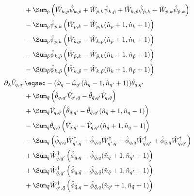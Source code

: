 \begin{appendix}
\begin{subequations}
\begin{align}
&+\Sum_{\tilde p} \left(\hat W_{k,\tilde p}\hat \psi_{k,\tilde p}+\hat W_{\tilde p,k}\hat \psi_{k,\tilde p}+\hat W_{k,\tilde p}\hat \psi_{\tilde p,k}  + \hat W_{\tilde p,k}\hat \psi_{\tilde p,k}\right) \nonumber\\
&- \Sum_{\tilde p}\hat \psi_{\tilde p,k} \left(\hat W_{ \tilde p,k}-\hat W_{ \tilde p,k}(\hat n_{\tilde p}+1,\hat n_{k}+1)\right)\nonumber\\
&-\Sum_{\tilde p}\hat \psi_{\tilde p,k} \left(\hat W_{k,\tilde p}-\hat W_{k,\tilde p}(\hat n_{\tilde p}+1,\hat n_{k}+1)\right) \nonumber\\
&-\Sum_{\tilde p}\hat \psi_{k,\tilde p} \left(\hat W_{\tilde p,k}-\hat W_{\tilde p,k}(\hat n_{k}+1,\hat n_{\tilde p}+1)\right) \nonumber\\
&-\Sum_{\tilde p}\hat \psi_{k,\tilde p} \left(\hat W_{k, \tilde p}-\hat W_{k, \tilde p}(\hat n_{k}+1,\hat n_{\tilde p}+1)\right) \nonumber\\
\partial_\lambda\hat V_{q,q^\prime}&\eqsec -(\hat\omega_q-\hat\omega_{q^\prime}(\hat n_q-1,\hat n_{q^\prime}+1))\hat \theta_{q,q^\prime}\\
&+ \Sum_{\tilde q} \left(\hat\theta_{q,q^\prime}\hat V_{q^\prime,\tilde q}-\hat\theta_{\tilde q,q^\prime}\hat V_{q,\tilde q}\right) \nonumber\\
&+\Sum_{\tilde q} \hat V_{q,\tilde q}\left(\hat\theta_{\tilde q,q^\prime}-\hat\theta_{\tilde q,q^\prime}(\hat n_{\tilde q}+1,\hat n_q-1)\right)\nonumber \\
&-\Sum_{\tilde q} \hat \theta_{q,\tilde q}\left(\hat V_{\tilde q,q^\prime}-\hat V_{\tilde q,q^\prime}(\hat n_{\tilde q}+1,\hat n_q-1)\right)\nonumber \\
&-\Sum_{\tilde q} \left(\hat\phi_{q,\tilde q}\hat W_{q^\prime,\tilde q}^\dagger+\hat\phi_{\tilde q,q}\hat W_{q^\prime,\tilde q}^\dagger+\hat\phi_{q,\tilde q}\hat W_{\tilde q,q^\prime}^\dagger  + \hat\phi_{\tilde q,q}\hat W_{\tilde q,q^\prime}^\dagger\right)\nonumber\\
&+\Sum_{\tilde q}\hat W_{\tilde q,q^\prime}^\dagger \left(\hat\phi_{ \tilde q,q}-\hat\phi_{ \tilde q,q}(\hat n_{\tilde q}+1,\hat n_{q^\prime}+1)\right) \nonumber\\
&+\Sum_{\tilde q}\hat W_{\tilde q,q^\prime}^\dagger \left(\hat\phi_{q,\tilde q}-\hat\phi_{q,\tilde q}(\hat n_{\tilde q}+1,\hat n_{q^\prime}+1)\right) \nonumber\\
&+\Sum_{\tilde q}\hat W_{q^\prime,\tilde q}^\dagger \left(\hat\phi_{\tilde q,q}-\hat\phi_{\tilde q,q}(\hat n_{q^\prime}+1,\hat n_{\tilde q}+1)\right) \nonumber\\

\end{align}
\end{subequations}
\end{appendix}
